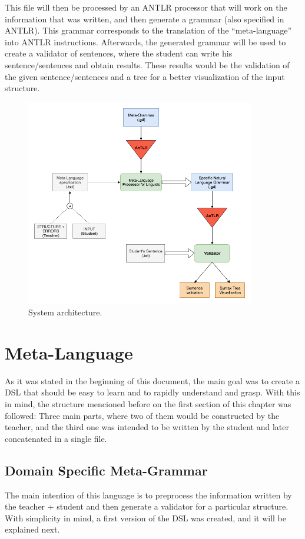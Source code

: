 This file will then be processed by an \textsc{ANTLR} processor that will work on the information that was written, and then generate a grammar (also specified in \textsc{ANTLR}). This grammar corresponds to the translation of the
``meta-language'' into \textsc{ANTLR} instructions. Afterwards, the generated grammar will be used to create a validator of sentences, where the student can write his sentence/sentences and obtain results. 
These results would be the validation of the given sentence/sentences and a tree for a better visualization of the input structure.

\begin{figure}[h]
    \centering
    \includegraphics[width=10cm]{images/msc_system_architecture.png}
    \caption{System architecture.}
    \label{fig:system_architecture}
\end{figure}

\section{Meta-Language}
As it was stated in the beginning of this document, the main goal was to create a \textsc{DSL} that should be easy to learn and to rapidly understand and grasp. With this in mind, the structure mencioned before on the first section
of this chapter was followed: Three main parts, where two of them would be constructed by the teacher, and the third one was intended to be written by the student and later concatenated in a single file.

\subsection{Domain Specific Meta-Grammar}
The main intention of this language is to preprocess the information written by the teacher + student and then generate a validator for a particular structure. With simplicity in mind, a first version of the \textsc{DSL} was created, and it will be explained next.


